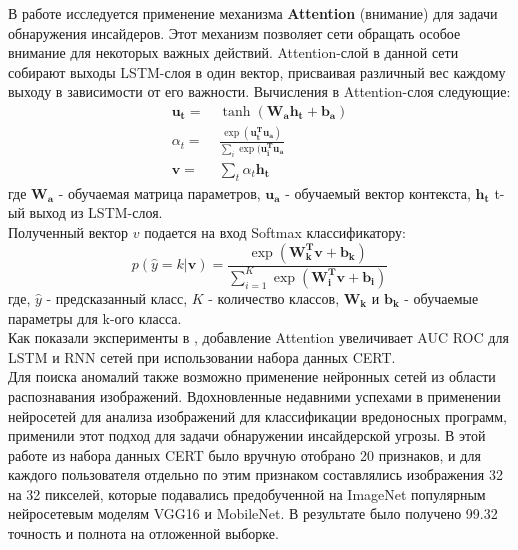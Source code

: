 В работе \cite{yuanAttentionBasedLSTMInsider2019} исследуется применение механизма \textbf{Attention} (внимание) для задачи обнаружения инсайдеров. Этот механизм позволяет сети обращать особое внимание для некоторых важных действий. Attention-слой в данной сети собирают выходы LSTM-слоя в один вектор, присваивая различный вес каждому выходу в зависимости от его важности. Вычисления в Attention-слоя следующие: \\
\begin{align}
\mathbf{u_t} = &\: \tanh (\mathbf{W_a}\mathbf{h_t}+\mathbf{b_a})\\
\alpha_t = &\: \frac{\exp (\mathbf{u_t^T}\mathbf{u_a})}{\sum_i \exp (\mathbf{u_i^T}\mathbf{u_a}}\\
\mathbf{v} = &\: \sum_t \alpha_t\mathbf{h_t}
\end{align}
где $\mathbf{W_a}$ - обучаемая матрица параметров, $\mathbf{u_a}$ - обучаемый вектор контекста, $\mathbf{h_t}$ t-ый выход из LSTM-слоя.\\
Полученный вектор $v$ подается на вход Softmax классификатору:
\begin{equation}
p(\hat{y}=k | \mathbf{v}) = \frac{\exp(\mathbf{W_k^T}\mathbf{v} + \mathbf{b_k})}{\sum^K_{i=1} \exp(\mathbf{W_i^T}\mathbf{v} + \mathbf{b_i})}
\end{equation}
где, $\hat{y}$ - предсказанный класс, $K$ - количество классов, $\mathbf{W_k}$ и $\mathbf{b_k}$ - обучаемые параметры для k-ого класса.\\
Как показали эксперименты в \cite{yuanAttentionBasedLSTMInsider2019}, добавление Attention увеличивает AUC ROC для LSTM и RNN сетей при использовании набора данных CERT.\\

Для поиска аномалий также возможно применение нейронных сетей из области распознавания изображений. Вдохновленные недавними успехами в применении нейросетей для анализа изображений для классификации вредоносных программ, \cite{gImageBasedFeatureRepresentation2019} применили этот подход для задачи обнаружении инсайдерской угрозы. В этой работе из набора данных CERT было вручную отобрано 20 признаков, и для каждого пользователя отдельно по этим признаком составлялись изображения 32 на 32 пикселей, которые подавались предобученной на ImageNet популярным нейросетевым моделям VGG16 и MobileNet. В результате было получено 99.32 точность и полнота на отложенной выборке.\\

